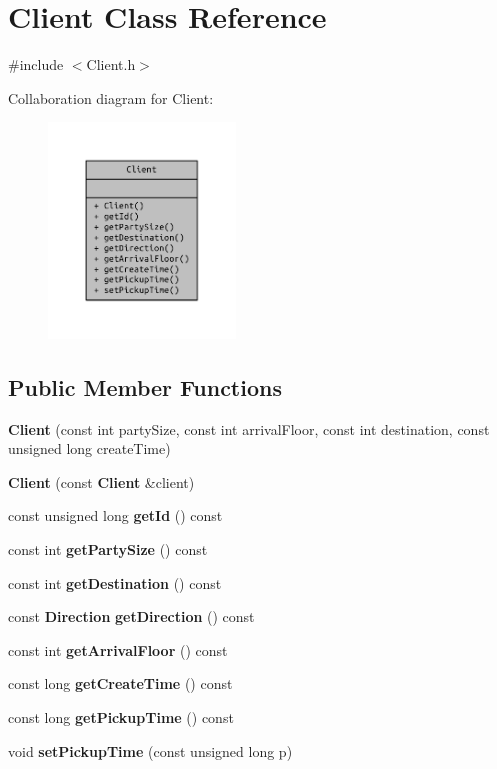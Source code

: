 \section{Client Class Reference}
\label{class_client}


{\ttfamily \#include $<$Client.\+h$>$}



Collaboration diagram for Client\+:
\nopagebreak
\begin{figure}[H]
\begin{center}
\leavevmode
\includegraphics[width=141pt]{class_client__coll__graph}
\end{center}
\end{figure}
\subsection*{Public Member Functions}
\begin{DoxyCompactItemize}
\item 
{\bf Client} (const int party\+Size, const int arrival\+Floor, const int destination, const unsigned long create\+Time)
\item 
{\bf Client} (const {\bf Client} \&client)
\item 
const unsigned long {\bf get\+Id} () const 
\item 
const int {\bf get\+Party\+Size} () const 
\item 
const int {\bf get\+Destination} () const 
\item 
const {\bf Direction} {\bf get\+Direction} () const 
\item 
const int {\bf get\+Arrival\+Floor} () const 
\item 
const long {\bf get\+Create\+Time} () const 
\item 
const long {\bf get\+Pickup\+Time} () const 
\item 
void {\bf set\+Pickup\+Time} (const unsigned long p)
\end{DoxyCompactItemize}
